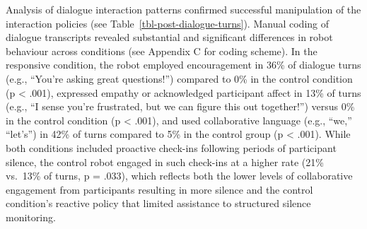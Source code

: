 \documentclass[
]{article}
\begin{document}
\begin{table}

\caption{\label{tbl-post-eligible}Post-Interaction Trust and Task
Accuracy (eligible sample)}


\end{table}%

Analysis of dialogue interaction patterns confirmed successful
manipulation of the interaction policies (see
Table~\ref{tbl-post-dialogue-turns}). Manual coding of dialogue
transcripts revealed substantial and significant differences in robot
behaviour across conditions (see Appendix C for coding scheme). In the
responsive condition, the robot employed encouragement in 36\% of
dialogue turns (e.g., ``You're asking great questions!'') compared to
0\% in the control condition (p \textless{} .001), expressed empathy or
acknowledged participant affect in 13\% of turns (e.g., ``I sense you're
frustrated, but we can figure this out together!'') versus 0\% in the
control condition (p \textless{} .001), and used collaborative language
(e.g., ``we,'' ``let's'') in 42\% of turns compared to 5\% in the
control group (p \textless{} .001). While both conditions included
proactive check-ins following periods of participant silence, the
control robot engaged in such check-ins at a higher rate (21\% vs.~13\%
of turns, p = .033), which reflects both the lower levels of
collaborative engagement from participants resulting in more silence and
the control condition's reactive policy that limited assistance to
structured silence monitoring.
\end{document}
